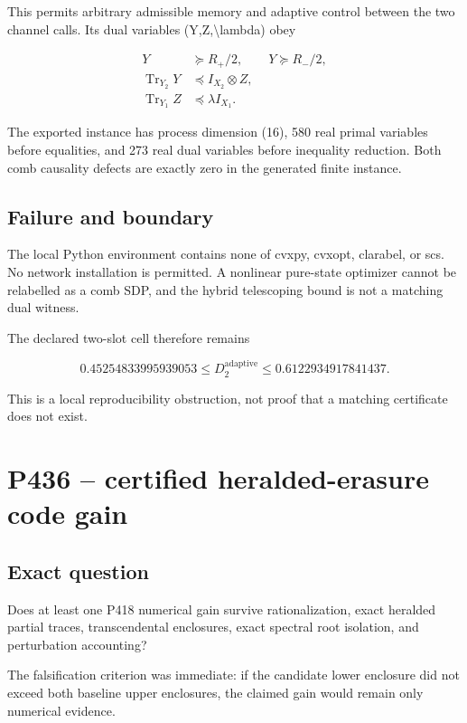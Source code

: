 \documentclass[11pt,a4paper,openany]{report}
\begin{document}
This permits arbitrary admissible memory and adaptive control between the two channel calls. Its dual variables (Y,Z,\textbackslash{}lambda) obey

\[
\begin{aligned}
Y&\succeq R_+/2,\qquad Y\succeq R_-/2,\\
\operatorname{Tr}_{Y_2}Y&\preceq I_{X_2}\otimes Z,\\
\operatorname{Tr}_{Y_1}Z&\preceq\lambda I_{X_1}.
\end{aligned}
\]

The exported instance has process dimension (16), 580 real primal variables before equalities, and 273 real dual variables before inequality reduction. Both comb causality defects are exactly zero in the generated finite instance.

\section{Failure and boundary}

The local Python environment contains none of cvxpy, cvxopt, clarabel, or scs. No network installation is permitted. A nonlinear pure-state optimizer cannot be relabelled as a comb SDP, and the hybrid telescoping bound is not a matching dual witness.

The declared two-slot cell therefore remains

\[
0.45254833995939053
\le D_2^{\mathrm{adaptive}}
\le0.6122934917841437.
\]

This is a local reproducibility obstruction, not proof that a matching certificate does not exist.

\chapter{P436 -- certified heralded-erasure code gain}

\section{Exact question}

Does at least one P418 numerical gain survive rationalization, exact heralded partial traces, transcendental enclosures, exact spectral root isolation, and perturbation accounting?

The falsification criterion was immediate: if the candidate lower enclosure did not exceed both baseline upper enclosures, the claimed gain would remain only numerical evidence.
\end{document}
